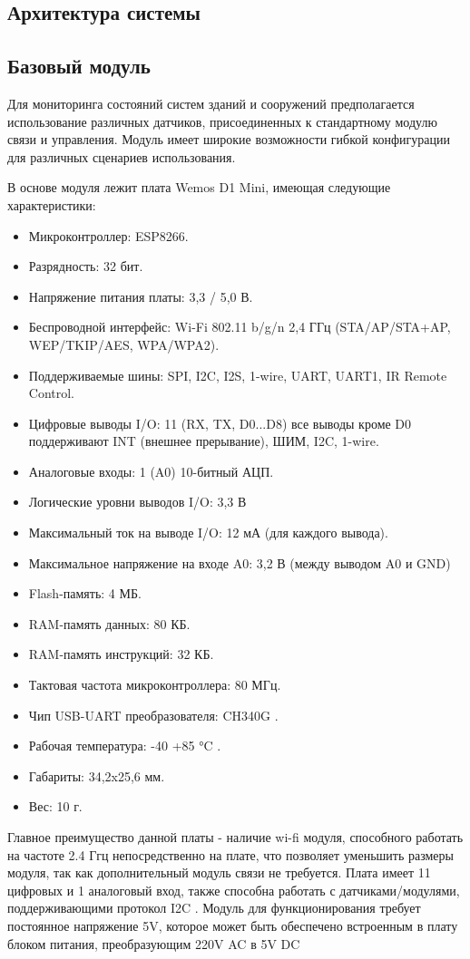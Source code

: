 \subsection{Архитектура системы}

\subsection{Базовый модуль}
Для мониторинга состояний систем зданий и сооружений предполагается использование различных датчиков, присоединенных к стандартному модулю связи и управления.
Модуль имеет широкие возможности гибкой конфигурации для различных сценариев использования.

В основе модуля лежит плата Wemos D1 Mini, имеющая следующие характеристики:
\begin{itemize}
    \item Микроконтроллер: ESP8266.
    \item Разрядность: 32 бит.
    \item Напряжение питания платы: 3,3 / 5,0 В.
    \item Беспроводной интерфейс: Wi-Fi 802.11 b/g/n 2,4 ГГц (STA/AP/STA+AP, WEP/TKIP/AES, WPA/WPA2).
    \item Поддерживаемые шины: SPI, I2C, I2S, 1-wire, UART, UART1, IR Remote Control.
    \item Цифровые выводы I/O: 11 (RX, TX, D0...D8) все выводы кроме D0 поддерживают INT (внешнее прерывание), ШИМ, I2C, 1-wire.
    \item Аналоговые входы: 1 (A0) 10-битный АЦП.
    \item Логические уровни выводов I/O: 3,3 В
    \item Максимальный ток на выводе I/O: 12 мА (для каждого вывода).
    \item Максимальное напряжение на входе A0: 3,2 В (между выводом A0 и GND)
    \item Flash-память: 4 МБ.
    \item RAM-память данных: 80 КБ.
    \item RAM-память инструкций: 32 КБ.
    \item Тактовая частота микроконтроллера: 80 МГц.
    \item Чип USB-UART преобразователя: CH340G .
    \item Рабочая температура: -40 +85 °C .
    \item Габариты: 34,2x25,6 мм.
    \item Вес: 10 г.
\end{itemize}
Главное преимущество данной платы - наличие wi-fi модуля, способного работать на частоте 2.4 Ггц непосредственно на плате, что позволяет уменьшить размеры модуля, так как дополнительный модуль связи не требуется.
Плата имеет 11 цифровых и 1 аналоговый вход, также способна работать с датчиками/модулями, поддерживающими протокол I2C .
Модуль для функционирования требует постоянное напряжение 5V, которое может быть обеспечено встроенным в плату блоком питания, преобразующим 220V AC в 5V DC

